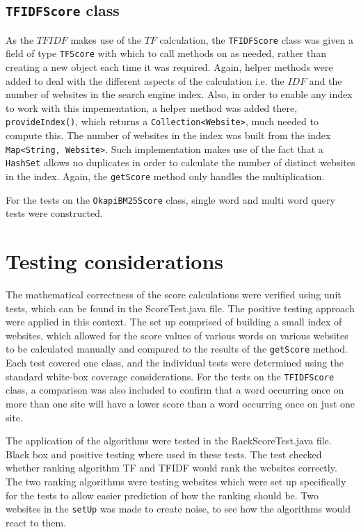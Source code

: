 \subsection{{\tt TFIDFScore} class}
As the $TFIDF$ makes use of the $TF$ calculation, the {\tt TFIDFScore} class was given a field of type {\tt TFScore} with which to call methods on as needed, rather than creating a new object each time it was required. Again, helper methods were added to deal with the different aspects of the calculation i.e. the $IDF$ and the number of websites in the search engine index. Also, in order to enable any index to work with this impementation, a helper method was added there, {\tt provideIndex()}, which returns a {\tt Collection<Website>}, much needed to compute this. The number of websites in the index was built from the index {\tt Map<String, Website>}. Such implementation makes use of the fact that a {\tt HashSet} allows no duplicates in order to calculate the number of distinct websites in the index.
Again, the {\tt getScore} method only handles the multiplication.

For the tests on the {\tt OkapiBM25Score} class, single word and multi word query tests were constructed.

\section{Testing considerations}
The mathematical correctness of the score calculations were verified using unit tests, which can be found in the ScoreTest.java file. The positive testing approach were applied in this context.
The set up comprised of building a small index of websites, which allowed for the score values of various words on various
websites to be calculated manually and compared to the results of the {\tt getScore} method.
Each test covered one class, and the individual tests were determined using the standard white-box coverage considerations. For the tests on the {\tt TFIDFScore} class, a comparison was also included to confirm that a word occurring once on more than one site will have a lower score than a word occurring once on just one site.

The application of the algorithms were tested in the RackScoreTest.java file. Black box and positive testing where used in these tests. The test checked whether ranking algorithm TF and TFIDF would rank the websites correctly. The two ranking algorithms were testing websites which were set up specifically for the tests to allow easier prediction of how the ranking should be. Two websites in the {\tt setUp} was made to create noise, to see how the algorithms would react to them.\\


